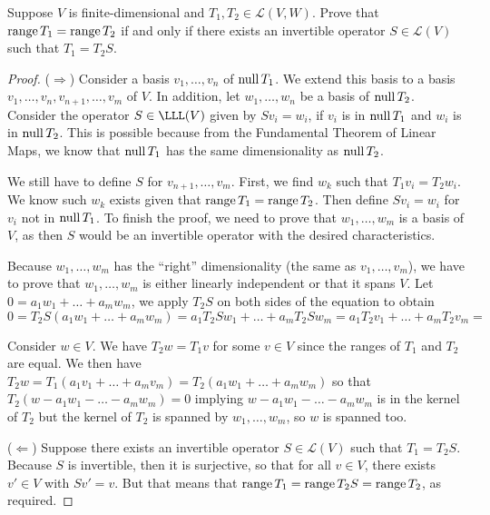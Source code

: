 \begin{exercise}{5}
  Suppose $V$ is finite-dimensional and $T_{1},T_{2}\in\mathcal{L}(V,W)$. Prove that $\operatorname*{range} T_{1}=\operatorname*{range} T_{2}$ if and only if there exists an invertible operator $S\in\mathcal{L}(V)$ such that $T_{1}=T_{2}S$.
\end{exercise}
\begin{proof}
 ($\Rightarrow$) Consider a basis $v_{1},\dots,v_{n}$ of $\operatorname*{null} T_{1}$. We extend this basis to a basis $v_{1},\dots,v_{n},v_{n+1},\dots,v_{m}$ of $V$. In addition, let $w_{1},\dots,w_{n}$ be a basis of $\operatorname*{null} T_{2}$. Consider the operator $S\in\LLL(V)$ given by $Sv_{i}=w_{i}$, if $v_{i}$ is in $\operatorname*{null} T_{1}$ and $w_{i}$ is in $\operatorname*{null} T_{2}$. This is possible because from the Fundamental Theorem of Linear Maps, we know that $\operatorname*{null} T_{1}$ has the same dimensionality as $\operatorname*{null} T_{2}$.
 
 We still have to define $S$ for $v_{n+1},\dots,v_{m}$. First, we find $w_{k}$ such that $T_{1}v_{i}=T_{2}w_{i}$. We know such $w_{k}$ exists given that $\operatorname*{range} T_{1}=\operatorname*{range} T_{2}$. Then define $Sv_{i}=w_{i}$ for $v_{i}$ not in $\operatorname*{null} T_{1}$. To finish the proof, we need to prove that $w_{1},\dots,w_{m}$ is a basis of $V$, as then $S$ would be an invertible operator with the desired characteristics.

 Because $w_{1},\dots,w_{m}$ has the ``right'' dimensionality (the same as $v_{1},\dots,v_{m}$), we have to prove that $w_{1},\dots,w_{m}$ is either linearly independent or that it spans $V$. Let $0=a_{1}w_{1}+\dots+a_{m}w_{m}$, we apply $T_{2}S$ on both sides of the equation to obtain $0= T_{2}S(a_{1}w_{1}+\dots+a_{m}w_{m})= a_{1}T_{2}Sw_{1}+\dots+a_{m}T_{2}Sw_{m}= a_{1}T_{2}v_{1}+\dots+a_{m}T_{2}v_{m}= $
 
 Consider $w\in V$. We have $T_{2}w=T_{1}v$ for some $v\in V$ since the ranges of $T_{1}$ and $T_{2}$ are equal. We then have $T_{2}w= T_{1}(a_{1}v_{1}+\dots+a_{m}v_{m})= T_{2}(a_{1}w_{1}+\dots+a_{m}w_{m})$ so that $T_{2}(w-a_{1}w_{1}-\dots-a_{m}w_{m})=0$ implying $w-a_{1}w_{1}-\dots-a_{m}w_{m}$ is in the kernel of $T_{2}$ but the kernel of $T_{2}$ is spanned by $w_{1},\dots,w_{m}$, so $w$ is spanned too.
 
 ($\Leftarrow$) Suppose there exists an invertible operator $S\in\mathcal{L}(V)$ such that $T_{1}=T_{2}S$. Because $S$ is invertible, then it is surjective, so that for all $v\in V$, there exists $v'\in V$ with $Sv'=v$. But that means that $\operatorname*{range} T_{1} = \operatorname*{range} T_{2}S=\operatorname*{range} T_{2}$, as required.
\end{proof}


